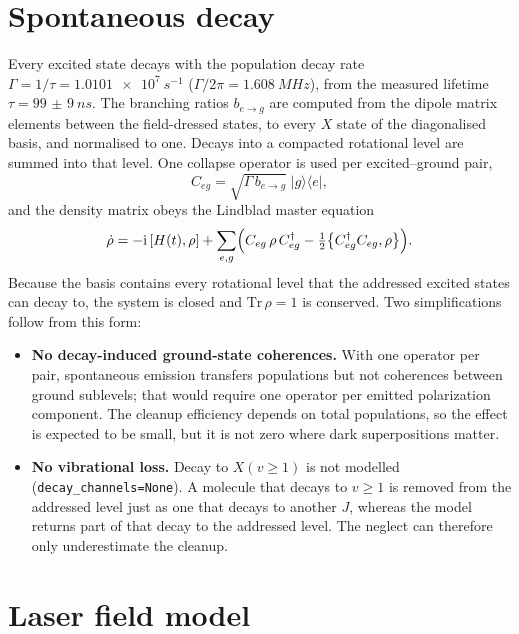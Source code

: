 \documentclass[11pt,a4paper,oneside]{report}
\newcommand{\code}[1]{\texttt{#1}}
\begin{document}
\section{Spontaneous decay}
\label{sec:decay}

Every excited state decays with the population decay rate
$\Gamma=1/\tau=\SI{1.0101e7}{s^{-1}}$ ($\Gamma/2\pi=\SI{1.608}{MHz}$), from the measured
lifetime $\tau=\SI{99(9)}{ns}$. The branching ratios $b_{e\to g}$ are computed from the
dipole matrix elements between the field-dressed states, to every $X$ state of the
diagonalised basis, and normalised to one. Decays into a compacted rotational level are
summed into that level. One collapse operator is used per excited--ground pair,
\begin{equation}
  C_{eg}=\sqrt{\Gamma\,b_{e\to g}}\;|g\rangle\langle e| ,
\end{equation}
and the density matrix obeys the Lindblad master equation~\cite{Lindblad1976}
\begin{equation}
  \dot\rho=-\mathrm i\,[H(t),\rho]
  +\sum_{e,g}\Bigl(C_{eg}\,\rho\,C_{eg}^\dagger-\tfrac12\bigl\{C_{eg}^\dagger C_{eg},\rho\bigr\}\Bigr).
  \label{eq:lindblad}
\end{equation}
Because the basis contains every rotational level that the addressed excited states can decay
to, the system is closed and $\mathrm{Tr}\,\rho=1$ is conserved. Two simplifications follow
from this form:
\begin{itemize}
  \item \textbf{No decay-induced ground-state coherences.} With one operator per pair,
        spontaneous emission transfers populations but not coherences between ground
        sublevels; that would require one operator per emitted polarization component. The
        cleanup efficiency depends on total populations, so the effect is expected to be
        small, but it is not zero where dark superpositions matter.
  \item \textbf{No vibrational loss.} Decay to $X(v\geq1)$ is not modelled
        (\code{decay\_channels=None}). A molecule that decays to $v\geq1$ is removed from the
        addressed level just as one that decays to another $J$, whereas the model returns
        part of that decay to the addressed level. The neglect can therefore only
        underestimate the cleanup.
\end{itemize}

\section{Laser field model}
\label{sec:laser}
\end{document}
